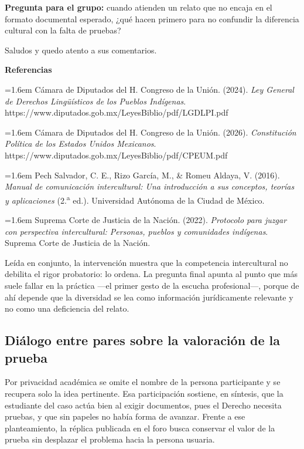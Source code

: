 \documentclass[
  spanish,
  letterpaper, oneside
]{article}
\begin{document}
\begin{forobox}[title={Participación publicada en el foro}]
\textbf{Pregunta para el grupo:} cuando atienden un relato que no encaja en el formato documental esperado, ¿qué hacen primero para no confundir la diferencia cultural con la falta de pruebas?\par
\medskip
Saludos y quedo atento a sus comentarios.
\medskip
\par\noindent\textbf{Referencias}\par
{\setlength{\parskip}{0.35em}%
\par\noindent\hangindent=1.6em Cámara de Diputados del H. Congreso de la Unión. (2024). \textit{Ley General de Derechos Lingüísticos de los Pueblos Indígenas}. https://www.diputados.gob.mx/LeyesBiblio/pdf/LGDLPI.pdf
\par\noindent\hangindent=1.6em Cámara de Diputados del H. Congreso de la Unión. (2026). \textit{Constitución Política de los Estados Unidos Mexicanos}. https://www.diputados.gob.mx/LeyesBiblio/pdf/CPEUM.pdf
\par\noindent\hangindent=1.6em Pech Salvador, C. E., Rizo García, M., \& Romeu Aldaya, V. (2016). \textit{Manual de comunicación intercultural: Una introducción a sus conceptos, teorías y aplicaciones} (2.\textsuperscript{a} ed.). Universidad Autónoma de la Ciudad de México.
\par\noindent\hangindent=1.6em Suprema Corte de Justicia de la Nación. (2022). \textit{Protocolo para juzgar con perspectiva intercultural: Personas, pueblos y comunidades indígenas}. Suprema Corte de Justicia de la Nación.
\par}
\end{forobox}

Leída en conjunto, la intervención muestra que la competencia intercultural no
debilita el rigor probatorio: lo ordena. La pregunta final apunta al punto que más
suele fallar en la práctica —el primer gesto de la escucha profesional—, porque de
ahí depende que la diversidad se lea como información jurídicamente relevante y no
como una deficiencia del relato.

\subsection{Diálogo entre pares sobre la valoración de la prueba}

Por privacidad académica se omite el nombre de la persona participante y se recupera
solo la idea pertinente. Esa participación sostiene, en síntesis, que la estudiante
del caso actúa bien al exigir documentos, pues el Derecho necesita pruebas, y que sin
papeles no había forma de avanzar. Frente a ese planteamiento, la réplica publicada en
el foro busca conservar el valor de la prueba sin desplazar el problema hacia la
persona usuaria.
\end{document}
